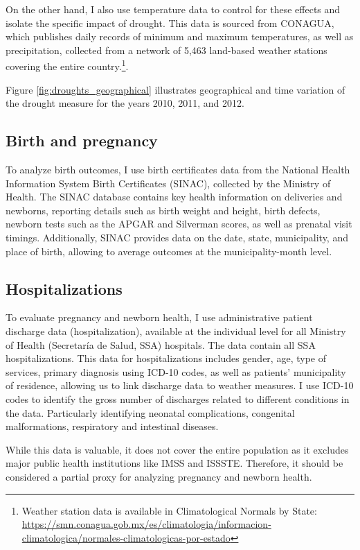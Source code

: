 \documentclass[12pt, oneside]{article}      %
\begin{document}
On the other hand, I also use temperature data to control for these effects and isolate the specific impact of drought. This data is sourced from CONAGUA, which publishes daily records of minimum and maximum temperatures, as well as precipitation, collected from a network of 5,463 land-based weather stations covering the entire country.\footnote{Weather station data is available in Climatological Normals by State: \url{https://smn.conagua.gob.mx/es/climatologia/informacion-climatologica/normales-climatologicas-por-estado}}.

Figure \ref{fig:droughts_geographical} illustrates geographical and time variation of the drought measure for the years 2010, 2011, and 2012.

\subsection{Birth and pregnancy}

To analyze birth outcomes, I use birth certificates data from the National Health Information System Birth Certificates (SINAC), collected by the Ministry of Health. The SINAC database contains key health information on deliveries and newborns, reporting details such as birth weight and height, birth defects, newborn tests such as the APGAR and Silverman scores, as well as prenatal visit timings. Additionally, SINAC provides data on the date, state, municipality, and place of birth, allowing to average outcomes at the municipality-month level.

\subsection{Hospitalizations}

To evaluate pregnancy and newborn health, I use administrative patient discharge data (hospitalization), available at the individual level for all Ministry of Health (Secretaría de Salud, SSA) hospitals. The data contain all SSA hospitalizations. This data for hospitalizations includes gender, age, type of services, primary diagnosis using ICD-10 codes, as well as patients' municipality of residence, allowing us to link discharge data to weather measures.  I use ICD-10 codes to identify the gross number of discharges related to different conditions in the data. Particularly identifying neonatal complications, congenital malformations, respiratory and intestinal diseases.

While this data is valuable, it does not cover the entire population as it excludes major public health institutions like IMSS and ISSSTE. Therefore, it should be considered a partial proxy for analyzing pregnancy and newborn health.
\end{document}
